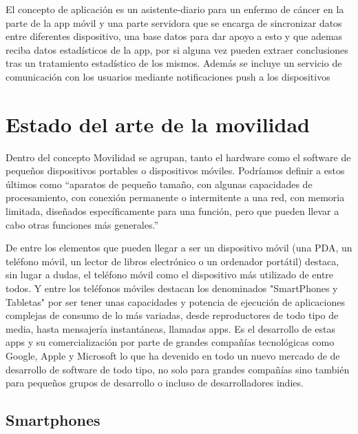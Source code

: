 \documentclass[../pfc.tex]{subfiles}
\begin{document}
	
	El concepto de aplicación es un asistente-diario para un enfermo de cáncer en la parte de la app móvil y una parte servidora que se encarga de sincronizar datos entre diferentes dispositivo, una base datos para dar apoyo a esto y que ademas reciba datos estadísticos de la app, por si alguna vez pueden extraer conclusiones tras un tratamiento estadístico de los mismos. Además se incluye un servicio de comunicación con los usuarios mediante notificaciones push a los dispositivos
	
	
	\section{Estado del arte de la movilidad}
	Dentro del concepto Movilidad se agrupan, tanto el hardware como el software de pequeños dispositivos portables o dispositivos móviles. Podríamos definir a estos últimos como “aparatos de pequeño tamaño, con algunas capacidades de procesamiento, con conexión permanente o intermitente a una red, con memoria limitada, diseñados específicamente para una función, pero que pueden llevar a cabo otras funciones más generales.”
	
	De entre los elementos que pueden llegar a ser un dispositivo móvil (una PDA, un teléfono móvil, un lector de libros electrónico o un ordenador portátil) destaca, sin lugar a dudas, el teléfono móvil como el dispositivo más utilizado de entre todos. Y entre los teléfonos móviles destacan los denominados "SmartPhones y Tabletas" por ser tener unas capacidades y potencia de ejecución de aplicaciones complejas de consumo de lo más variadas, desde reproductores de todo tipo de media, hasta mensajería instantáneas, llamadas apps. Es el desarrollo de estas apps y su comercialización por parte de grandes compañías tecnológicas como Google, Apple y Microsoft lo que ha devenido en todo un nuevo mercado de de desarrollo de software de todo tipo, no solo para grandes compañías sino también para pequeños grupos de desarrollo o incluso de desarrolladores indies. 
	
	\subsection{Smartphones}
	
\end{document}
